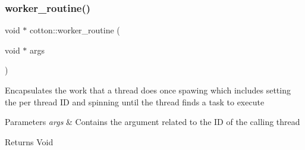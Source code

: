 \subsubsection{\texorpdfstring{worker\+\_\+routine()}{worker\_routine()}}
{\footnotesize\ttfamily void $\ast$ cotton\+::worker\+\_\+routine (\begin{DoxyParamCaption}\item[{void $\ast$}]{args }\end{DoxyParamCaption})}

Encapsulates the work that a thread does once spawing which includes setting the per thread ID and spinning until the thread finds a task to execute


\begin{DoxyParams}{Parameters}
{\em args} & Contains the argument related to the ID of the calling thread \\
\hline
\end{DoxyParams}
\begin{DoxyReturn}{Returns}
Void 
\end{DoxyReturn}
